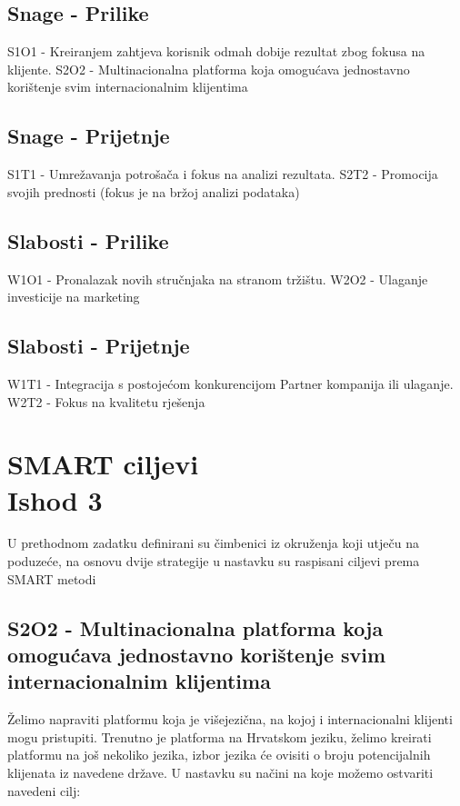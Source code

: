 \documentclass[a4paper]{article}
\begin{document}
	\subsection{Snage - Prilike}
	
	S1O1 - Kreiranjem zahtjeva korisnik odmah dobije rezultat zbog fokusa na klijente. S2O2 - Multinacionalna platforma koja omogućava jednostavno korištenje svim internacionalnim klijentima

	\subsection{Snage - Prijetnje}

	S1T1 - Umrežavanja potrošača i fokus na analizi rezultata. S2T2 -  Promocija svojih prednosti (fokus je na bržoj analizi podataka)
	
	\subsection{Slabosti - Prilike}

	W1O1 - Pronalazak novih stručnjaka na stranom tržištu. W2O2 - Ulaganje investicije na marketing
	
	\subsection{Slabosti - Prijetnje}

	W1T1 - Integracija s postojećom konkurencijom Partner kompanija ili ulaganje. W2T2 - Fokus na kvalitetu rješenja 

\clearpage

\section[Section Title. Section Subtitle]{SMART ciljevi\\ {\small Ishod 3}}
	U prethodnom zadatku definirani su čimbenici iz okruženja koji utječu na poduzeće, na osnovu dvije strategije u nastavku su raspisani ciljevi prema SMART metodi
	
	\subsection{S2O2 - Multinacionalna platforma koja omogućava jednostavno korištenje svim internacionalnim klijentima}
	Želimo napraviti platformu koja je višejezična, na kojoj i internacionalni klijenti mogu pristupiti. Trenutno je platforma na Hrvatskom jeziku, želimo kreirati platformu na još nekoliko jezika, izbor jezika će ovisiti o broju potencijalnih klijenata iz navedene države. U nastavku su načini na koje možemo ostvariti navedeni cilj:
	
\end{document}
